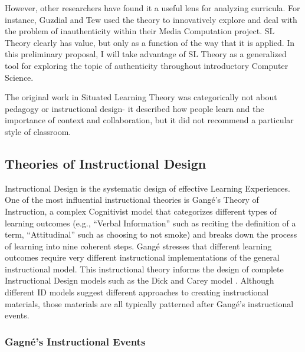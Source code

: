 However, other researchers have found it a useful lens for analyzing curricula.
For instance, Guzdial and Tew \cite{guzdial2006imagineering} used the theory to innovatively explore and deal with the problem of inauthenticity within their Media Computation project.
SL Theory clearly has value, but only as a function of the way that it is applied.
In this preliminary proposal, I will take advantage of SL Theory as a generalized tool for exploring the topic of authenticity throughout introductory Computer Science.

The original work in Situated Learning Theory was categorically not about pedagogy or instructional design- it described how people learn and the importance of context and collaboration, but it did not recommend a particular style of classroom.

\subsection{Theories of Instructional Design}

Instructional Design is the systematic design of effective Learning Experiences. One of the most influential\cite{anglin1992reference} instructional theories is Gang\'{e}'s Theory of Instruction, a complex Cognitivist model that categorizes different types of learning outcomes (e.g., ``Verbal Information'' such as reciting the definition of a term, ``Attitudinal'' such as choosing to not smoke) and breaks down the process of learning into nine coherent steps. Gang\'{e} stresses that different learning outcomes require very different instructional implementations of the general instructional model. This instructional theory informs the design of complete Instructional Design models such as the Dick and Carey model \cite{carey2001systematic}. Although different ID models suggest different approaches to creating instructional materials, those materials are all typically patterned after Gang\'{e}'s instructional events.

\subsubsection{Gagn\'{e}'s Instructional Events}

